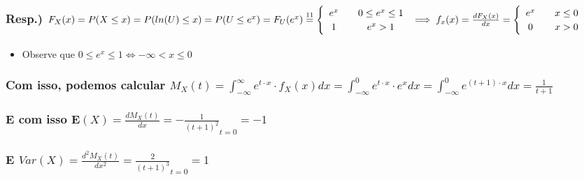 \documentclass[english]{article}
\begin{document}
\subsubsection*{\textmd{Resp.) $F_{X}(x)=P(X\leq x)=P(ln(U)\leq x)=P(U\leq e^{x})=F_{U}(e^{x})\protect\overset{11}{=}\protect\begin{cases}
\protect\begin{array}{c}
e^{x}\protect\\
1
\protect\end{array} & \protect\begin{array}{c}
0\leq e^{x}\leq1\protect\\
e^{x}>1
\protect\end{array}\protect\end{cases}\protect\implies f_{x}(x)=\frac{dF_{X}(x)}{dx}=\protect\begin{cases}
\protect\begin{array}{c}
e^{x}\protect\\
0
\protect\end{array} & \protect\begin{array}{c}
x\leq0\protect\\
x>0
\protect\end{array}\protect\end{cases}$}}
\begin{itemize}
\item Observe que $0\leq e^{x}\leq1\Longleftrightarrow-\infty<x\leq0$
\end{itemize}

\subsubsection*{\textmd{Com isso, podemos calcular $M_{X}(t)=\int_{-\infty}^{\infty}e^{t\cdot x}\cdot f_{X}(x)dx=\int_{-\infty}^{0}e^{t\cdot x}\cdot e^{x}dx=\int_{-\infty}^{0}e^{(t+1)\cdot x}dx=\frac{1}{t+1}$}}


\subsubsection*{\textmd{E com isso $\mathbf{E}(X)=\frac{dM_{X}(t)}{dx}=-\frac{1}{(t+1)^{2}}_{t=0}=-1$}}


\subsubsection*{\textmd{E $Var(X)=\frac{d^{2}M_{X}(t)}{dx^{2}}=\frac{2}{(t+1)^{3}}_{t=0}=1$}}
\end{document}
